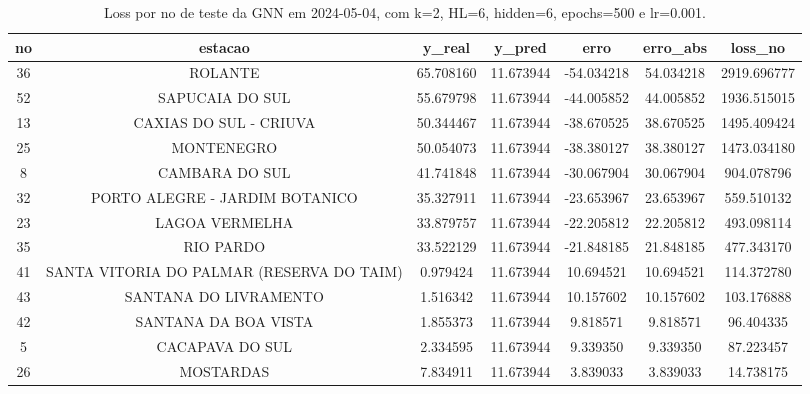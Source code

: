 \begin{table}[h]
\centering
\caption{Loss por no de teste da GNN em 2024-05-04, com k=2, HL=6, hidden=6, epochs=500 e lr=0.001.}
\label{tab:gnn_loss_k2_hl6_h6_e500_d20240504}
\begin{tabular}{ccccccc}
\toprule
no & estacao & y\_real & y\_pred & erro & erro\_abs & loss\_no \\
\midrule
36 & ROLANTE & 65.708160 & 11.673944 & -54.034218 & 54.034218 & 2919.696777 \\
52 & SAPUCAIA DO SUL & 55.679798 & 11.673944 & -44.005852 & 44.005852 & 1936.515015 \\
13 & CAXIAS DO SUL - CRIUVA & 50.344467 & 11.673944 & -38.670525 & 38.670525 & 1495.409424 \\
25 & MONTENEGRO & 50.054073 & 11.673944 & -38.380127 & 38.380127 & 1473.034180 \\
8 & CAMBARA DO SUL & 41.741848 & 11.673944 & -30.067904 & 30.067904 & 904.078796 \\
32 & PORTO ALEGRE - JARDIM BOTANICO & 35.327911 & 11.673944 & -23.653967 & 23.653967 & 559.510132 \\
23 & LAGOA VERMELHA & 33.879757 & 11.673944 & -22.205812 & 22.205812 & 493.098114 \\
35 & RIO PARDO & 33.522129 & 11.673944 & -21.848185 & 21.848185 & 477.343170 \\
41 & SANTA VITORIA DO PALMAR (RESERVA DO TAIM) & 0.979424 & 11.673944 & 10.694521 & 10.694521 & 114.372780 \\
43 & SANTANA DO LIVRAMENTO & 1.516342 & 11.673944 & 10.157602 & 10.157602 & 103.176888 \\
42 & SANTANA DA BOA VISTA & 1.855373 & 11.673944 & 9.818571 & 9.818571 & 96.404335 \\
5 & CACAPAVA DO SUL & 2.334595 & 11.673944 & 9.339350 & 9.339350 & 87.223457 \\
26 & MOSTARDAS & 7.834911 & 11.673944 & 3.839033 & 3.839033 & 14.738175 \\
\bottomrule
\end{tabular}
\end{table}
